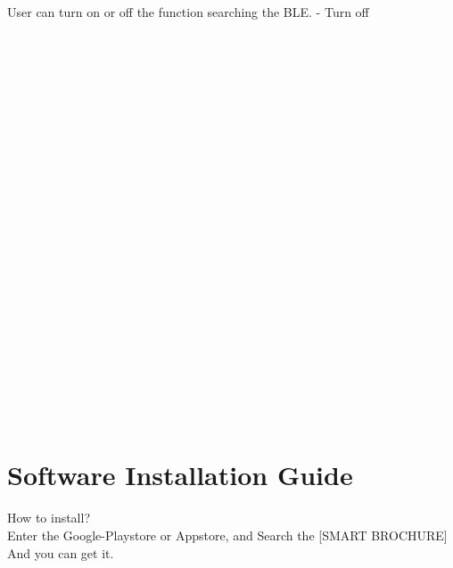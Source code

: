\documentclass[conference]{IEEEtran}
\begin{document}
User can turn on or off the function searching the BLE. - Turn off\\\\\\\\\\\\\\\\\\\\\\\\\\\\\\\\\\\\\\\\\\\\\\\


\section{Software Installation Guide\\}
 How to install?\\

Enter the Google-Playstore or Appstore, and Search the [SMART BROCHURE] And you can get it. \\\\\\\\
\end{document}
